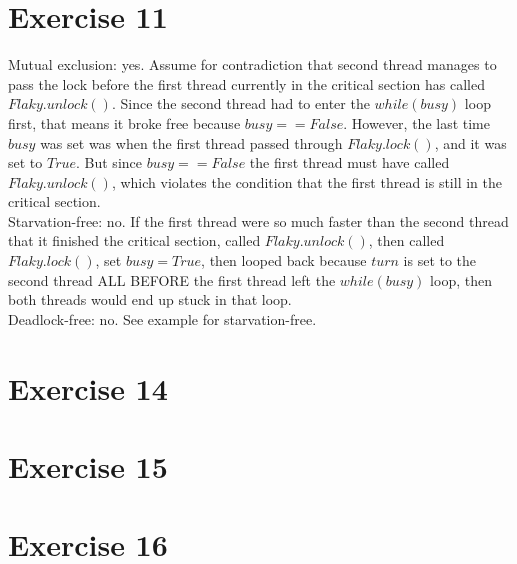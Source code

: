 \documentclass{article}
\begin{document}
\begin{adjustwidth}{-2cm}{-2cm}
\section{Exercise 11}
Mutual exclusion: yes. Assume for contradiction that second thread manages to pass the lock before the first thread currently in the critical section has called $Flaky.unlock()$. Since the second thread had to enter the $while(busy)$ loop first, that means it broke free because $busy == False$. However, the last time $busy$ was set was when the first thread passed through $Flaky.lock()$, and it was set to $True$. But since $busy == False$ the first thread must have called $Flaky.unlock()$, which violates the condition that the first thread is still in the critical section.\\
Starvation-free: no. If the first thread were so much faster than the second thread that it finished the critical section, called $Flaky.unlock()$, then called $Flaky.lock()$, set $busy = True$, then looped back because $turn$ is set to the second thread ALL BEFORE the first thread left the $while(busy)$ loop, then both threads would end up stuck in that loop.\\
Deadlock-free: no. See example for starvation-free.

\section{Exercise 14}


\section{Exercise 15}


\section{Exercise 16}


\end{adjustwidth}
\end{document}
